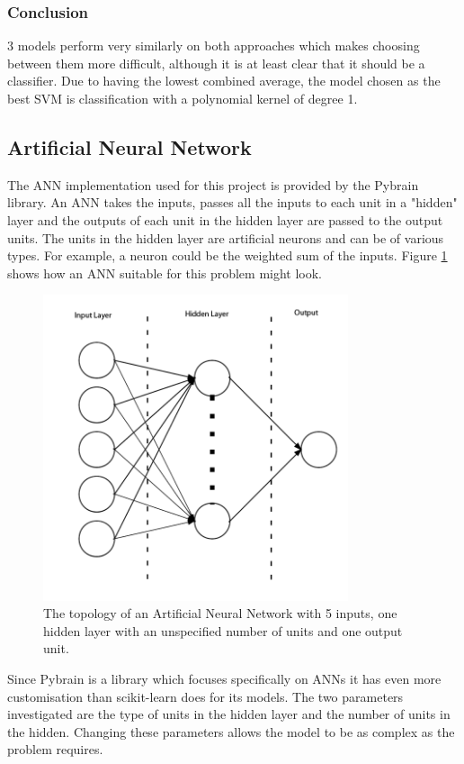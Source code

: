 \subsubsection{Conclusion}
3 models perform very similarly on both approaches which makes choosing between them more difficult, although it is at least clear that it should be a classifier. Due to having the lowest combined average, the model chosen as the best SVM is classification with a polynomial kernel of degree 1.

\subsection{Artificial Neural Network}
The ANN implementation used for this project is provided by the Pybrain library. An ANN takes the inputs, passes all the inputs to each unit in a "hidden" layer and the outputs of each unit in the hidden layer are passed to the output units. The units in the hidden layer are artificial neurons and can be of various types. For example, a neuron could be the weighted sum of the inputs. Figure \ref{fig:nn} shows how an ANN suitable for this problem might look. 

\begin{figure}[h!]
\centering
\includegraphics[width=0.8\textwidth]{images/nn.png}
\caption{The topology of an Artificial Neural Network with 5 inputs, one hidden layer with an unspecified number of units and one output unit.}
\label{fig:nn}
\end{figure}

Since Pybrain is a library which focuses specifically on ANNs it has even more customisation than scikit-learn does for its models. The two parameters investigated are the type of units in the hidden layer and the number of units in the hidden. Changing these parameters allows the model to be as complex as the problem requires.

